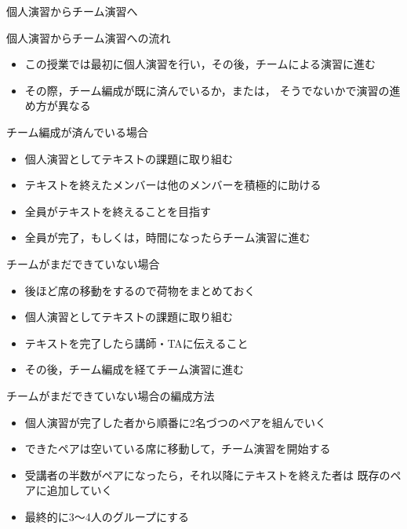 \documentclass[a4paper,twoside,twocolumn]{beamer}
\begin{document}
\begin{frame}[label=sec-3]{個人演習からチーム演習へ}
\begin{block}{個人演習からチーム演習への流れ}
\begin{itemize}
\item この授業では最初に個人演習を行い，その後，チームによる演習に進む
\item その際，チーム編成が既に済んでいるか，または，
そうでないかで演習の進め方が異なる
\end{itemize}
\end{block}

\begin{block}{チーム編成が済んでいる場合}
\begin{itemize}
\item 個人演習としてテキストの課題に取り組む
\item テキストを終えたメンバーは他のメンバーを積極的に助ける
\item 全員がテキストを終えることを目指す
\item 全員が完了，もしくは，時間になったらチーム演習に進む
\end{itemize}
\end{block}

\begin{block}{チームがまだできていない場合}
\begin{itemize}
\item 後ほど席の移動をするので荷物をまとめておく
\item 個人演習としてテキストの課題に取り組む
\item テキストを完了したら講師・TAに伝えること
\item その後，チーム編成を経てチーム演習に進む
\end{itemize}
\end{block}

\begin{block}{チームがまだできていない場合の編成方法}
\begin{itemize}
\item 個人演習が完了した者から順番に2名づつのペアを組んでいく
\item できたペアは空いている席に移動して，チーム演習を開始する
\item 受講者の半数がペアになったら，それ以降にテキストを終えた者は
既存のペアに追加していく
\item 最終的に3〜4人のグループにする
\end{itemize}
\end{block}
\end{frame}
\end{document}
